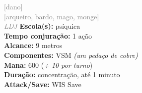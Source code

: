 \documentclass{RPG_Adventure}[2021/10/20]
\begin{document}
{\scriptsize \textcolor{gray}{[dano]\\}}
{\scriptsize \textcolor{gray}{[arqueiro, bardo, mago, monge]\\}}
{\tiny \textcolor{gray}{\textit{LDJ}}}
{\small \t \textbf{Escola(s):} psíquica\\\t \textbf{Tempo conjuração:} 1 ação\\\t \textbf{Alcance:} 9 metros\\\t \textbf{Componentes:} VSM \textit{(um pedaço de cobre)}\\\t \textbf{Mana:} 600 (\textit{+ 10 por turno})\\\t \textbf{Duração:} concentração, até 1 minuto\\\t \textbf{Attack/Save:} WIS Save\\}
\end{document}
